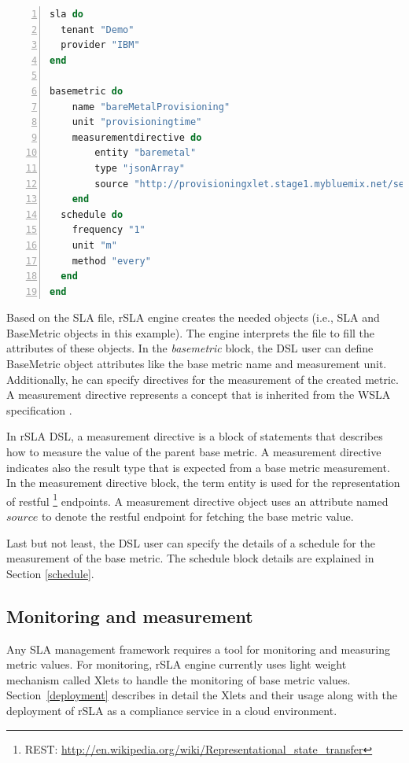 \begin{minipage}{0.9\textwidth}
\begin{lstlisting}[language=Ruby, basicstyle=\small\normalfont\sffamily, breaklines=true,  captionpos=b, mathescape=true, caption=rSLA SLA (lines 1-4) and basemetric (lines 6-19) 
creation script, label=basescript, numbers=left, numbersep=5pt, numberstyle=\tiny] 
sla do
  tenant "Demo"
  provider "IBM"
end  

basemetric do
    name "bareMetalProvisioning"
    unit "provisioningtime"
    measurementdirective do
    	entity "baremetal"
    	type "jsonArray"
    	source "http://provisioningxlet.stage1.mybluemix.net/server/baremetal/provisioningtime" 
  	end
  schedule do    
  	frequency "1"
    unit "m"
    method "every"
  end
end
\end{lstlisting}
\end{minipage} 

Based on the SLA file, rSLA engine creates the needed objects (i.e., SLA and BaseMetric objects in this example). The engine interprets the file to fill the attributes of these 
objects. In the \emph{basemetric} block, the DSL user can define BaseMetric object attributes like the base metric name and measurement unit. Additionally, he can specify 
directives for the measurement of the created metric. A measurement directive represents a concept that is inherited from the WSLA specification \cite{wsla}. 

In rSLA DSL, a measurement directive is a block of statements that describes how to measure the value of the parent base metric. A measurement directive indicates also the 
result type that is expected from a base metric measurement. In the measurement directive block, the term entity is used for the representation of restful \footnote{REST: 
\url{http://en.wikipedia.org/wiki/Representational_state_transfer}} endpoints. A measurement directive object uses an attribute named $source$ to denote the restful endpoint for 
fetching the base metric value. %

Last but not least, the DSL user can specify the details of a schedule for the measurement of the base metric. The schedule block details are explained in Section \ref{schedule}.

\subsection{Monitoring and measurement}
Any SLA management framework requires a tool for monitoring and measuring metric values. For monitoring, rSLA engine currently uses light weight mechanism 
called Xlets to handle the monitoring of base metric values. Section~\ref{deployment} describes in detail the Xlets and their usage along with the 
deployment of rSLA as a compliance service in a cloud environment.

